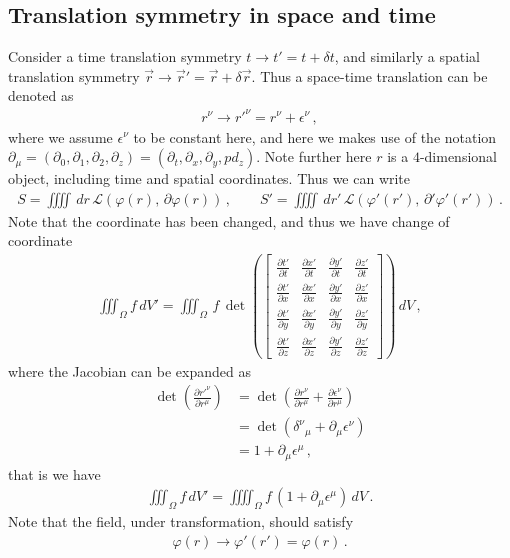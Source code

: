 \documentclass[11pt, onesided]{book}
\theoremstyle{break}
\theoremstyle{break}
\newcommand{\pd}{\partial}
\newcommand{\bmat}[1]{\begin{bmatrix} #1 \end{bmatrix}}
\begin{document}
\subsection{Translation symmetry in space and time}
Consider a time translation symmetry $t \to t' = t + \delta t$, and similarly a spatial translation symmetry $\vec{r} \to \vec{r}' = \vec{r} + \delta \vec{r}$. Thus a space-time translation can be denoted as 
\begin{align*}
r^\nu \to r'^{\nu} = r^\nu + \epsilon^\nu\,,
\end{align*}
where we assume $\epsilon^\nu$ to be constant here, and here we makes use of the notation $\pd_\mu = (\pd_0, \pd_1, \pd_2, \pd_z)=(\pd_t, \pd_x, \pd_y, pd_z)$. Note further here $r$ is a $4$-dimensional object, including time and spatial coordinates. Thus we can write
\begin{align*}
S = \iiiint \, dr \, \mathcal{L}\left(\varphi(r),\, \pd\varphi(r)\right)\,,\qquad 
S' = \iiiint \, dr' \, \mathcal{L}\left(\varphi'(r'),\, \pd'\varphi'(r')\right)\,.
\end{align*}
Note that the coordinate has been changed, and thus we have change of coordinate
\begin{align*}
\iiint_{\Omega} f\, dV' = \iiint_{\Omega}\, f\, \det\left(
\bmat{\frac{\pd t'}{\pd t}&  \frac{\pd x'}{\pd t}&  \frac{\pd y'}{\pd t}&  \frac{\pd z'}{\pd t}\\
\frac{\pd t'}{\pd x}&  \frac{\pd x'}{\pd x}&  \frac{\pd y'}{\pd x}&  \frac{\pd z'}{\pd x}\\
\frac{\pd t'}{\pd y}&  \frac{\pd x'}{\pd y}&  \frac{\pd y'}{\pd y}&  \frac{\pd z'}{\pd y}\\
\frac{\pd t'}{\pd z}&  \frac{\pd x'}{\pd z}&  \frac{\pd y'}{\pd z}&  \frac{\pd z'}{\pd z} } 
\right)\, dV\,,
\end{align*}
where the Jacobian can be expanded as
\begin{align*}
\det\left( \frac{\pd r'^\nu}{\pd r^\mu}\right) 
&= \det\left( \frac{\pd r^\nu}{\pd r^\mu} +\frac{\pd \epsilon^\nu}{\pd r^\mu}\right)\\
&= \det\left( \delta^\nu{}_\mu + \pd_\mu \epsilon^\nu\right) \\
&= 1 + \pd_\mu\epsilon^\mu\,,
\end{align*}
that is we have
\begin{align*}
\iiint_{\Omega} f\, dV' = \iiiint_{\Omega} f\, (1 + \pd_\mu \epsilon^\mu)\, dV\,.
\end{align*}
Note that the field, under transformation, should satisfy 
\begin{align*}
\varphi(r) \to \varphi'(r') = \varphi(r)\,.
\end{align*}
\end{document}
